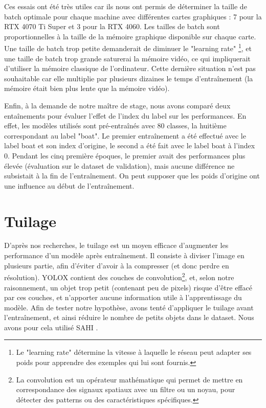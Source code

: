 Ces essais ont été très utiles car ils nous ont permis de déterminer la taille de batch
optimale \cite{Goodfellow-et-al-2016} pour chaque machine avec différentes cartes graphiques :
7 pour la RTX 4070 Ti Super et 3 pour la RTX 4060.
Les tailles de batch sont proportionnelles à la taille de la mémoire graphique
disponible sur chaque carte. Une taille de batch trop petite demanderait de diminuer le "learning rate"
\footnote{Le "learning rate" détermine la vitesse à laquelle le réseau peut adapter ses poids
pour apprendre des exemples qui lui sont fournis.}, et une taille de batch trop grande
saturerai la mémoire vidéo, ce qui impliquerait d'utiliser la mémoire classique de l'ordinateur.
Cette dernière situation n'est pas souhaitable car elle multiplie par plusieurs dizaines
le temps d'entraînement (la mémoire était bien plus lente que la mémoire vidéo).

Enfin, à la demande de notre maître de stage, nous avons comparé deux entaînements pour évaluer
l'effet de l'index du label sur les performances.
En effet, les modèles utilisés sont pré-entraînés avec 80 classes, la huitième correspondant
au label "boat". Le premier entraînement a été effectué avec le label boat et son index d'origine,
le second a été fait avec le label boat à l'index 0.
Pendant les cinq première époques, le premier avait des performances plus élevée (évaluation sur
le dataset de validation), mais aucune différence ne subsistait à la fin de l'entraînement.
On peut supposer que les poids d'origine ont une influence au début de l'entraînement.


\section{Tuilage}

D'après nos recherches, le tuilage est un moyen efficace d'augmenter les performance d'un modèle après
entraînement. Il consiste à diviser l'image en plusieurs partie, afin d'éviter d'avoir à la compresser
(et donc perdre en résolution).
YOLOX contient des couches de convolution\footnote{La convolution est un opérateur mathématique
qui permet de mettre en correspondance des signaux spatiaux avec un filtre ou un noyau,
pour détecter des patterns ou des caractéristiques spécifiques.}, et, selon notre raisonnement,
un objet trop petit (contenant peu de pixels) risque d'être effacé par ces couches, et n'apporter
aucune information utile à l'apprentissage du modèle.
Afin de tester notre hypothèse, avons tenté d'appliquer le tuilage avant l'entraînement,
et ainsi réduire le nombre de petits objets dans le dataset.
Nous avons pour cela utilisé SAHI \cite{Akyon_Altinuc_Temizel_2022}.

